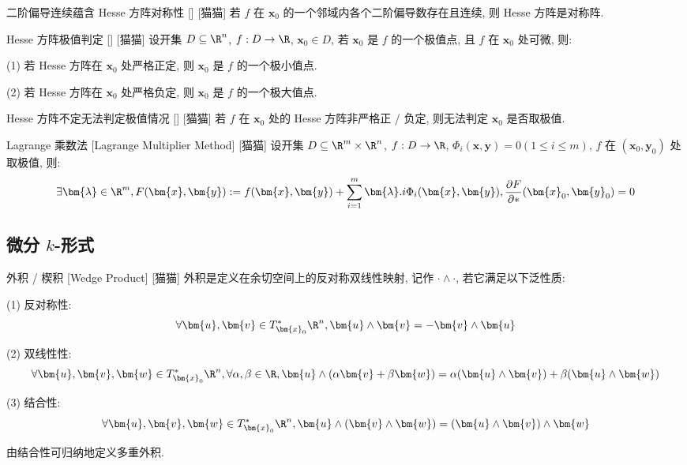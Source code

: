 \documentclass[UTF8]{ctexart}
\begin{document}
			\begin{ppt}
				[]
				{二阶偏导连续蕴含 Hesse 方阵对称性}
				[]
				[猫猫]
				若 \(f\) 在 \(\bm{x}_0\) 的一个邻域内各个二阶偏导数存在且连续, 则 Hesse 方阵是对称阵. 
			\end{ppt}
			
			\begin{thm}
				[]
				{Hesse 方阵极值判定}
				[]
				[猫猫]
				设开集 \(D\subseteq\R^n\), \(f:D\to\R\), \(\bm{x}_0\in D\), 若 \(\bm{x}_0\) 是 \(f\) 的一个极值点, 且 \(f\) 在 \(\bm{x}_0\) 处可微, 则: 

				(1) 若 Hesse 方阵在 \(\bm{x}_0\) 处严格正定, 则 \(\bm{x}_0\) 是 \(f\) 的一个极小值点. 

				(2) 若 Hesse 方阵在 \(\bm{x}_0\) 处严格负定, 则 \(\bm{x}_0\) 是 \(f\) 的一个极大值点. 
			\end{thm}
			
			\begin{cxmp}
				[]
				{Hesse 方阵不定无法判定极值情况}
				[]
				[猫猫]
				若 \(f\) 在 \(\bm{x}_0\) 处的 Hesse 方阵非严格正 / 负定, 则无法判定 \(\bm{x}_0\) 是否取极值. 
			\end{cxmp}
			
			\begin{thm}
				[]
				{Lagrange 乘数法}
				[Lagrange Multiplier Method]
				[猫猫]
				设开集 \(D\subseteq\R^m\times\R^n\), \(f:D\to\R\), \(\Phi_i(\bm{x},\bm{y})=0(1\leq i\leq m)\), \(f\) 在 \((\bm{x}_0, \bm{y}_0)\) 处取极值, 则: 
				\[\exists\bm{\lambda}\in\R^m, F(\bm{x},\bm{y}):=f(\bm{x},\bm{y})+\sum_{i=1}^{m}\bm{\lambda}.i\Phi_i(\bm{x},\bm{y}), \frac{\partial F}{\partial *}(\bm{x}_0,\bm{y}_0)=0\]
			\end{thm}
		
		\subsection{微分 \(k\)-形式}

			\begin{dfn}
			    []
			    {外积 / 楔积}
			    [Wedge Product]
			    [猫猫]
				外积是定义在余切空间上的反对称双线性映射, 记作 \(\cdot\wedge\cdot\), 若它满足以下泛性质: 

				(1) 反对称性: 
				\[\forall \bm{u},\bm{v}\in T^*_{\bm{x}_0}\R^n, \bm{u}\wedge\bm{v}=-\bm{v}\wedge\bm{u}\]

				(2) 双线性性: 
				\[\forall \bm{u},\bm{v},\bm{w}\in T^*_{\bm{x}_0}\R^n, \forall \alpha,\beta\in\R, \bm{u}\wedge(\alpha\bm{v}+\beta\bm{w})=\alpha(\bm{u}\wedge\bm{v})+\beta(\bm{u}\wedge\bm{w})\]

				(3) 结合性: 
				\[\forall \bm{u},\bm{v},\bm{w}\in T^*_{\bm{x}_0}\R^n, \bm{u}\wedge(\bm{v}\wedge\bm{w})=(\bm{u}\wedge\bm{v})\wedge\bm{w}\]

				由结合性可归纳地定义多重外积. 
			\end{dfn}
\end{document}
